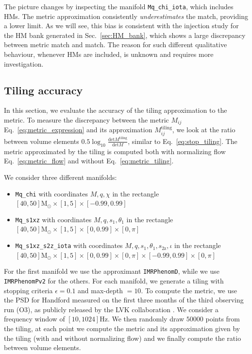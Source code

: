 \documentclass[twocolumn,showpacs,preprintnumbers,nofootinbib,prd,
superscriptaddress,10pt]{revtex4-2}
\begin{document}
The picture changes by inspecting the manifold \texttt{Mq\_chi\_iota}, which includes HMs.
The metric approximation consistently {\it underestimates} the match, providing a lower limit.
As we will see, this bias is consistent with the injection study for the HM bank generated in Sec.~\ref{sec:HM_bank}, which shows a large discrepancy between metric match and match.
The reason for such different qualitative behaviour, whenever HMs are included, is unknown and requires more investigation. 

\subsection{Tiling accuracy} \label{sec:tiling_accuracy}

In this section, we evaluate the accuracy of the tiling approximation to the metric. To measure the discrepancy between the metric $M_{ij}$ Eq.~\eqref{eq:metric_expression} and its approximation $M^\text{tiling}_{ij}$, we look at the ratio between volume elements $0.5\log_{\textrm{10}}\frac{\text{det} M^\text{tiling}}{\text{det}M}$, similar to Eq.~\eqref{eq:stop_tiling}.
The metric approximated by the tiling is computed both with normalizing flow Eq.~\eqref{eq:metric_flow} and without Eq.~\eqref{eq:metric_tiling}.

We consider three different manifolds:
\begin{itemize}
	\item \texttt{Mq\_chi} with coordinates $M, q, \chi $ in the rectangle $[40, 50] \mathrm{M_\odot} \times [1,5] \times [-0.99, 0.99]$
	\item \texttt{Mq\_s1xz} with coordinates $M, q, s_{1}, \theta_1$ in the rectangle $[40, 50] \mathrm{M_\odot} \times [1,5] \times [0, 0.99] \times [0,\pi]$
	\item \texttt{Mq\_s1xz\_s2z\_iota} with coordinates $M, q, s_{1}, \theta_1, s_\text{2z}, \iota$ in the rectangle $[40, 50] \mathrm{M_\odot} \times [1,5] \times [0, 0.99] \times [0,\pi] \times [-0.99, 0.99] \times [0, \pi]$
\end{itemize}
For the first manifold we use the approximant \texttt{IMRPhenomD}, while we use \texttt{IMRPhenomPv2} for the others.
For each manifold, we generate a tiling with stopping criteria $\epsilon = 0.1$ and max-depth $= 10$.
To compute the metric, we use the PSD for Handford measured on the first three months of the third observing run (O3), as publicly released by the LVK collaboration \cite{O3a_PSDs}. We consider a frequency window of $[10, 1024] \text{Hz}$.
We then randomly draw $50000$ points from the tiling, at each point we compute the metric and its approximation given by the tiling (with and without normalizing flow) and we finally compute the ratio between volume elements.
\end{document}
